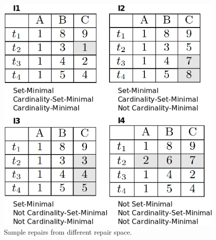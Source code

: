 \begin{figure}
   \centering
   \includegraphics[scale=0.3]{cardinalityEg.png}
   \caption{Sample repairs from different repair space.}
   \label{fig:cardinalityEg}
\end{figure}
